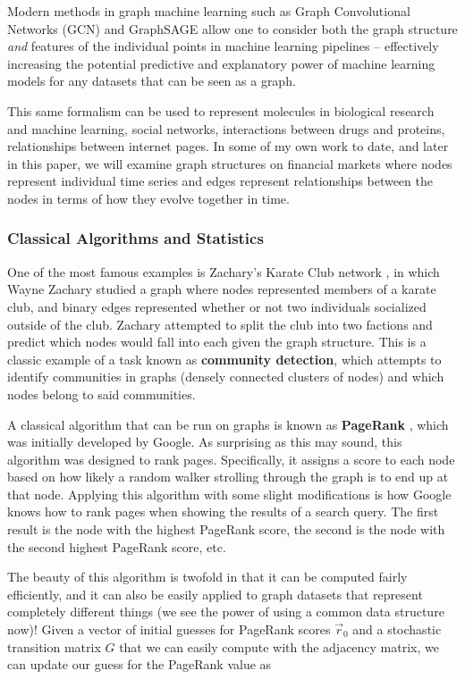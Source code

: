 \documentclass{article}
\theoremstyle{definition}
\begin{document}
Modern methods in graph machine learning such as Graph Convolutional Networks (GCN) \cite{GCNPaper} and GraphSAGE \cite{graphSAGE} allow one to consider both the graph structure \textit{and} features of the individual points in machine learning pipelines -- effectively increasing the potential predictive and explanatory power of machine learning models for any datasets that can be seen as a graph. 

This same formalism can be used to represent molecules in biological research and machine learning, social networks, interactions between drugs and proteins, relationships between internet pages. In some of my own work to date, and later in this paper, we will examine graph structures on financial markets where nodes represent individual time series and edges represent relationships between the nodes in terms of how they evolve together in time. 

\subsubsection{Classical Algorithms and Statistics}

One of the most famous examples is Zachary's Karate Club network \cite{zacharyKarateClub}, in which Wayne Zachary studied a graph where nodes represented members of a karate club, and binary edges represented whether or not two individuals socialized outside of the club. Zachary attempted to split the club into two factions and predict which nodes would fall into each given the graph structure. This is a classic example of a task known as \textbf{community detection}, which attempts to identify communities in graphs (densely connected clusters of nodes) and which nodes belong to said communities.

A classical algorithm that can be run on graphs is known as \textbf{PageRank} \cite{PageRank}, which was initially developed by Google. As surprising as this may sound, this algorithm was designed to rank pages. Specifically, it assigns a score to each node based on how likely a random walker strolling through the graph is to end up at that node. Applying this algorithm with some slight modifications is how Google knows how to rank pages when showing the results of a search query. The first result is the node with the highest PageRank score, the second is the node with the second highest PageRank score, etc. 

The beauty of this algorithm is twofold in that it can be computed fairly efficiently, and it can also be easily applied to graph datasets that represent completely different things (we see the power of using a common data structure now)! Given a vector of initial guesses for PageRank scores $\Vec{r}_0$ and a stochastic transition matrix $G$ that we can easily compute with the adjacency matrix, we can update our guess for the PageRank value as
\end{document}
